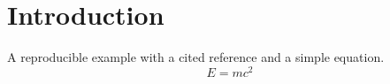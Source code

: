 \section{Introduction}
A reproducible example with a cited reference and a simple equation.
\[E=mc^2\]
